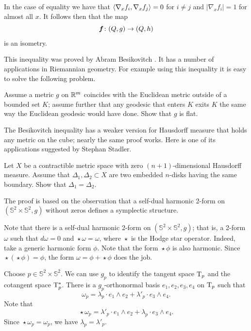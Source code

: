 In the case of equality we have that $\langle\nabla_x f_i,\nabla_x f_j\rangle=0$ for $i\ne j$ 
and $|\nabla_x f_i|=1$ for almost all $x$.
It follows then that the map 
\[\bm{f}\:(Q,g)\z\to (Q,h)\] 
is an isometry.
\qeds

This inequality was proved by Abram Besikovitch \cite{besicovitch}.
It has a number of applications in Riemannian geometry.
For example using this inequality it is easy to solve the following problem.

\begin{pr}
Assume a metric $g$ on $\mathbb{R}^m$ coincides with the Euclidean metric outside of a bounded set $K$;
assume further that any geodesic that enters $K$ exits $K$ the same way the Euclidean geodesic would have done. 
Show that $g$ is flat.
\end{pr}


The Besikovitch inequality has a weaker version for Hausdorff measure that holds any metric on the cube;
nearly the same proof works.
Here is one of its applications suggested by Stephan Stadler.

\begin{pr}
Let $X$ be a contractible metric space with zero $(n+1)$-dimensional Hausdorff measure.
Assume that $\Delta_1,\Delta_2\subset X$ are two embedded $n$-disks having the same boundary.
Show that $\Delta_1=\Delta_2$.
\end{pr}



The proof is based on the observation that a self-dual harmonic 2-form on $(\mathbb{S}^2\times\mathbb{S}^2,g)$
without zeros defines a symplectic structure.

\medskip

Note that there is a self-dual harmonic 2-form on $(\mathbb{S}^2\times\mathbb{S}^2,g)$;
that is, a 2-form $\omega$ such that $d\omega=0$ and $\mathop{\star}\omega=\omega$,
where $\mathop{\star}$ is the Hodge star operator.
Indeed, take a generic harmonic form $\phi$.
Note that the form $\mathop{\star}\phi$ is also harmonic.
Since $\mathop{\star}(\mathop{\star}\phi)=\phi$,
the form $\omega=\phi+\mathop{\star}\phi$ does the job.

Choose $p\in \mathbb{S}^2\times\mathbb{S}^2$.
We can use $g_p$ to identify the tangent space $\mathrm{T}_p$ and the cotangent space $\mathrm{T}^*_p$.
There is a $g_p$-orthonormal basis $e_1, e_2, e_3, e_4$ on $\mathrm{T}_p$ such that 
\[\omega_p=\lambda_p\cdot e_1\wedge e_2+\lambda'_p\cdot  e_3\wedge e_4.\]
Note that 
\[\mathop{\star}\omega_p=\lambda'_p\cdot e_1\wedge e_2+\lambda_p\cdot  e_3\wedge e_4.\]
Since $\mathop{\star}\omega_p=\omega_p$, we have $\lambda_p=\lambda'_p$.

